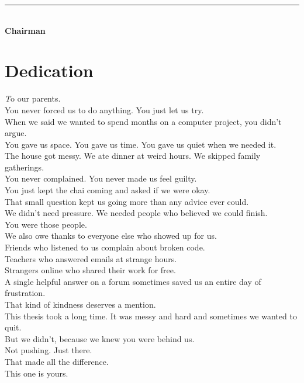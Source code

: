 \documentclass[12pt, a4paper, oneside]{book}
\begin{document}
\vspace{0.6in}

\noindent \rule{2.2in}{0.4pt}\\
\textbf{Chairman}

\clearpage
\thispagestyle{plain}
\chapter*{Dedication}
\begin{center}
\emph
To our parents.\\
You never forced us to do anything. You just let us try.\\
When we said we wanted to spend months on a computer project, you didn't argue.\\
You gave us space. You gave us time. You gave us quiet when we needed it.\\
The house got messy. We ate dinner at weird hours. We skipped family gatherings.\\
You never complained. You never made us feel guilty.\\
You just kept the chai coming and asked if we were okay.\\
That small question kept us going more than any advice ever could.\\
We didn't need pressure. We needed people who believed we could finish.\\
You were those people.\\
\bigskip
We also owe thanks to everyone else who showed up for us.\\
Friends who listened to us complain about broken code.\\
Teachers who answered emails at strange hours.\\
Strangers online who shared their work for free.\\
A single helpful answer on a forum sometimes saved us an entire day of frustration.\\
That kind of kindness deserves a mention.\\
\bigskip
This thesis took a long time. It was messy and hard and sometimes we wanted to quit.\\
But we didn't, because we knew you were behind us.\\
Not pushing. Just there.\\
That made all the difference.\\
\bigskip
This one is yours.

\end{center}
\end{document}
